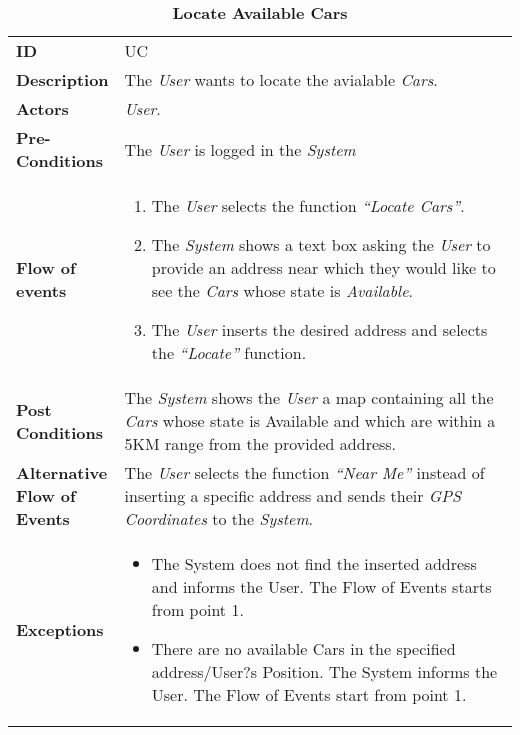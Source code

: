 \begin{longtable}{|p{0.2\linewidth} p{0.8\linewidth}|}
	\captionsetup{labelformat=empty} %
	\caption{\textbf{Locate Available Cars}} %
	\label{UC_LocateCars}%
	\\ \hline %
	
	\textbf{ID} & UC\theUseCaseIdCounter \\ \hline
	\textbf{Description} & The \emph{User} wants to locate the avialable \emph{Cars}. \\ \hline
	\textbf{Actors} & \emph{User}.\\ \hline
	\textbf{Pre-Conditions} & The \emph{User} is logged in the \emph{System} \\ \hline
	\textbf{Flow of events} & 
	\begin{enumerate}
		\item The \emph{User} selects the function \textit{\textquotedblleft{Locate Cars}\textquotedblright}.
		\item The \emph{System} shows a text box asking the \emph{User} to provide an address near which they would like to see the \emph{Cars} whose state is \textit{Available}.
		\item The \emph{User} inserts the desired address and selects the \textit{\textquotedblleft{Locate}\textquotedblright} function.
	\end{enumerate}	 \\ \hline
	\textbf{Post Conditions} & The \emph{System} shows the \emph{User} a map containing all the \emph{Cars} whose state is Available and which are within a 5KM range from the provided address. \\ \hline
	\textbf{Alternative Flow of Events} & The \emph{User} selects the function \textit{\textquotedblleft{Near Me}\textquotedblright} instead of inserting a specific address and sends their \emph{GPS Coordinates} to the \emph{System}. \\ \hline
	\textbf{Exceptions} & 
	\begin{itemize}
		\item The System does not find the inserted address and informs the User. The Flow of Events starts from point 1.
		\item There are no available Cars in the specified address/User?s Position. The System informs the User. The Flow of Events start from point 1.
	\end{itemize} \\ \hline
\end{longtable}

